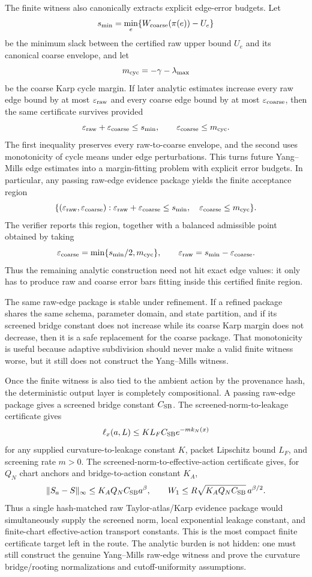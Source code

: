 The finite witness also canonically extracts explicit edge-error budgets. Let
\[
  s_{\min}=\min_e\{W_{\rm coarse}(\pi(e))-U_e\}
\]
be the minimum slack between the certified raw upper bound $U_e$ and its
canonical coarse envelope, and let
\[
  m_{\rm cyc}=-\gamma-\lambda_{\max}
\]
be the coarse Karp cycle margin. If later analytic estimates increase every
raw edge bound by at most $\varepsilon_{\rm raw}$ and every coarse edge bound
by at most $\varepsilon_{\rm coarse}$, then the same certificate survives
provided
\[
  \varepsilon_{\rm raw}+\varepsilon_{\rm coarse}\leq s_{\min},
  \qquad
  \varepsilon_{\rm coarse}\leq m_{\rm cyc}.
\]
The first inequality preserves every raw-to-coarse envelope, and the second
uses monotonicity of cycle means under edge perturbations. This turns future
Yang--Mills edge estimates into a margin-fitting problem with explicit error
budgets. In particular, any passing raw-edge evidence package yields the
finite acceptance region
\[
  \{(\varepsilon_{\rm raw},\varepsilon_{\rm coarse}):
  \varepsilon_{\rm raw}+\varepsilon_{\rm coarse}\leq s_{\min},\quad
  \varepsilon_{\rm coarse}\leq m_{\rm cyc}\}.
\]
The verifier reports this region, together with a balanced admissible point
obtained by taking
\[
  \varepsilon_{\rm coarse}=\min\{s_{\min}/2,m_{\rm cyc}\},\qquad
  \varepsilon_{\rm raw}=s_{\min}-\varepsilon_{\rm coarse}.
\]
Thus the remaining analytic construction need not hit exact edge values: it
only has to produce raw and coarse error bars fitting inside this certified
finite region.

The same raw-edge package is stable under refinement. If a refined package
shares the same schema, parameter domain, and state partition, and if its
screened bridge constant does not increase while its coarse Karp margin does
not decrease, then it is a safe replacement for the coarse package. That
monotonicity is useful because adaptive subdivision should never make a valid
finite witness worse, but it still does not construct the Yang--Mills witness.

Once the finite witness is also tied to the ambient action by the provenance
hash, the deterministic output layer is completely compositional. A passing
raw-edge package gives a screened bridge constant $C_{\rm SB}$. The
screened-norm-to-leakage certificate gives
\[
  \ell_x(a,L)\leq K L_F C_{\rm SB} e^{-m k_N(x)}
\]
for any supplied curvature-to-leakage constant $K$, packet Lipschitz bound
$L_F$, and screening rate $m>0$. The screened-norm-to-effective-action
certificate gives, for $Q_N$ chart anchors and bridge-to-action constant
$K_A$,
\[
  \|S_a-S\|_\infty\leq K_A Q_N C_{\rm SB}a^\beta,
  \qquad
  W_1\leq R\sqrt{K_A Q_N C_{\rm SB}}\,a^{\beta/2}.
\]
Thus a single hash-matched raw Taylor-atlas/Karp evidence package would
simultaneously supply the screened norm, local exponential leakage constant,
and finite-chart effective-action transport constants. This is the most compact
finite certificate target left in the route. The analytic burden is not hidden:
one must still construct the genuine Yang--Mills raw-edge witness and prove the
curvature bridge/rooting normalizations and cutoff-uniformity assumptions.

